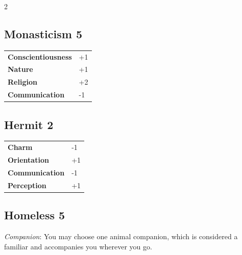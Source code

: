 \begin{multicols}{2}
\begin{tcolorbox}
\end{tcolorbox}

\begin{tcolorbox}
    \subsection*{Monasticism \hfill \small{5 }}
    \tcblower




\begin{tabular}{@{}ll@{}}
    \textbf{Conscientiousness} & +1\\
    \textbf{Nature} & +1\\
    \textbf{Religion} & +2\\
    \textbf{Communication} & -1\\
\end{tabular}


\end{tcolorbox}

\begin{tcolorbox}
    \subsection*{Hermit \hfill \small{2 }}
    \tcblower




\begin{tabular}{@{}ll@{}}
    \textbf{Charm} & -1\\
    \textbf{Orientation} & +1\\
    \textbf{Communication} & -1\\
    \textbf{Perception} & +1\\
\end{tabular}


\end{tcolorbox}

\begin{tcolorbox}
    \subsection*{Homeless \hfill \small{5 }}
    \tcblower
\textit{Companion}: You may choose one animal companion, which is considered a familiar and accompanies you wherever you go.



\end{tcolorbox}
\end{multicols}

